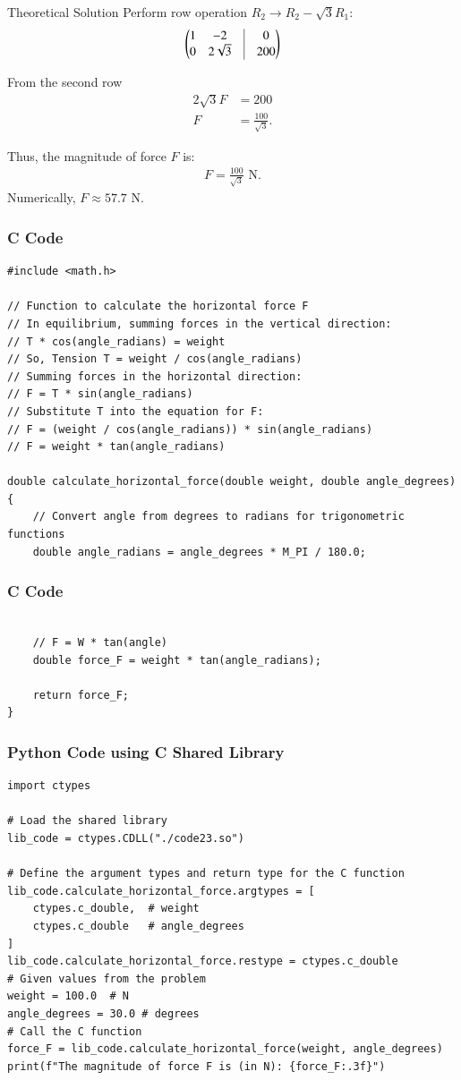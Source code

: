 \documentclass{beamer}
\begin{document}
\begin{frame}{Theoretical Solution}
Perform row operation $R_2 \rightarrow R_2 - \sqrt3 R_1$:
\begin{align}
\myvec{
1 & -2 & \vrule & 0 \\
0 & 2\sqrt3 & \vrule & 200
}
\end{align}

From the second row
\begin{align}
2\sqrt3 F &= 200 \\
F &= \frac{100}{\sqrt3}.
\end{align}

Thus, the magnitude of force $F$ is:
\begin{align}
F = \frac{100}{\sqrt3} \text{ N}.
\end{align}
Numerically,
$F \approx 57.7 \text{ N}$.
\end{frame}

\begin{frame}[fragile]
\frametitle{C Code}
\begin{lstlisting}
#include <math.h>

// Function to calculate the horizontal force F
// In equilibrium, summing forces in the vertical direction:
// T * cos(angle_radians) = weight
// So, Tension T = weight / cos(angle_radians)
// Summing forces in the horizontal direction:
// F = T * sin(angle_radians)
// Substitute T into the equation for F:
// F = (weight / cos(angle_radians)) * sin(angle_radians)
// F = weight * tan(angle_radians)

double calculate_horizontal_force(double weight, double angle_degrees) {
    // Convert angle from degrees to radians for trigonometric functions
    double angle_radians = angle_degrees * M_PI / 180.0;
\end{lstlisting}
\end{frame}

\begin{frame}[fragile]
\frametitle{C Code}
\begin{lstlisting}

    // F = W * tan(angle)
    double force_F = weight * tan(angle_radians);

    return force_F;
}
\end{lstlisting}
\end{frame}

\begin{frame}[fragile]
\frametitle{Python Code using C Shared Library}
\begin{lstlisting}
import ctypes

# Load the shared library
lib_code = ctypes.CDLL("./code23.so")

# Define the argument types and return type for the C function
lib_code.calculate_horizontal_force.argtypes = [
    ctypes.c_double,  # weight
    ctypes.c_double   # angle_degrees
]
lib_code.calculate_horizontal_force.restype = ctypes.c_double
# Given values from the problem
weight = 100.0  # N
angle_degrees = 30.0 # degrees
# Call the C function
force_F = lib_code.calculate_horizontal_force(weight, angle_degrees)
print(f"The magnitude of force F is (in N): {force_F:.3f}")
\end{lstlisting}
\end{frame}
\end{document}
